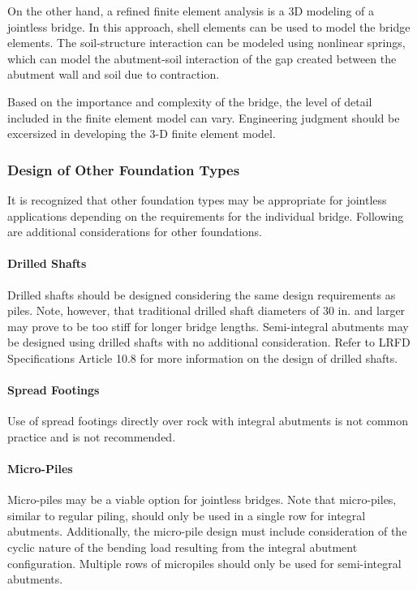 On the other hand, a refined finite element analysis is a 3D modeling of a jointless bridge. In this approach, shell
elements can be used to model the bridge elements. The soil-structure interaction can be modeled using nonlinear
springs, which can model the abutment-soil interaction of the gap created between the abutment wall and soil due to
contraction.

Based on the importance and complexity of the bridge, the level of detail included in the finite element model can
vary. Engineering judgment should be excersized in developing the 3-D finite element model.

\subsubsection{Design of Other Foundation Types}
It is recognized that other foundation types may be appropriate for jointless applications depending on the
requirements for the individual bridge. Following are additional considerations for other foundations.
\paragraph{Drilled Shafts}
Drilled shafts should be designed considering the same design requirements as piles. Note, however, that
traditional drilled shaft diameters of 30 in. and larger may prove to be too stiff for longer bridge lengths. Semi-integral
abutments may be designed using drilled shafts with no additional consideration. Refer to LRFD Specifications
Article 10.8 for more information on the design of drilled shafts.

\paragraph{Spread Footings}
Use of spread footings directly over rock with integral abutments is not common practice and is not
recommended.

\paragraph{Micro-Piles}
Micro-piles may be a viable option for jointless bridges. Note that micro-piles, similar to regular piling, should
only be used in a single row for integral abutments. Additionally, the micro-pile design must include consideration of
the cyclic nature of the bending load resulting from the integral abutment configuration. Multiple rows of micropiles
should only be used for semi-integral abutments.

